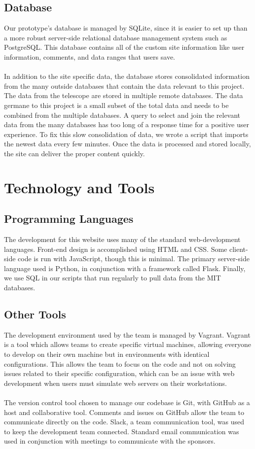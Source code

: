 \documentclass[12pt]{article}
\begin{document}
\begin{spacing}{1.5}
\subsection{Database}
Our prototype's database is managed by SQLite, since it is easier to set up than a more robust server-side relational database management system such as PostgreSQL. This database contains all of the custom site information like user information, comments, and data ranges that users save.
\\ \\
In addition to the site specific data, the database stores consolidated information from the many outside databases that contain the data relevant to this project. The data from the telescope are stored in multiple remote databases. The data germane to this project is a small subset of the total data and needs to be combined from the multiple databases. A query to select and join the relevant data from the many databases has too long of a response time for a positive user experience. To fix this slow consolidation of data, we wrote a script that imports the newest data every few minutes. Once the data is processed and stored locally, the site can deliver the proper content quickly.

\section{Technology and Tools}
\subsection{Programming Languages}
The development for this website uses many of the standard web-development languages. Front-end design is accomplished using HTML and CSS. Some client-side code is run with JavaScript, though this is minimal. The primary server-side language used is Python, in conjunction with a framework called Flask. Finally, we use SQL in our scripts that run regularly to pull data from the MIT databases.

\subsection{Other Tools}
The development environment used by the team is managed by Vagrant. Vagrant is a tool which allows teams to create specific virtual machines, allowing everyone to develop on their own machine but in environments with identical configurations. This allows the team to focus on the code and not on solving issues related to their specific configuration, which can be an issue with web development when users must simulate web servers on their workstations.
\\ \\
The version control tool chosen to manage our codebase is Git, with GitHub as a host and collaborative tool. Comments and issues on GitHub allow the team to communicate directly on the code. Slack, a team communication tool, was used to keep the development team connected. Standard email communication was used in conjunction with meetings to communicate with the sponsors.


\end{spacing}
\end{document}
